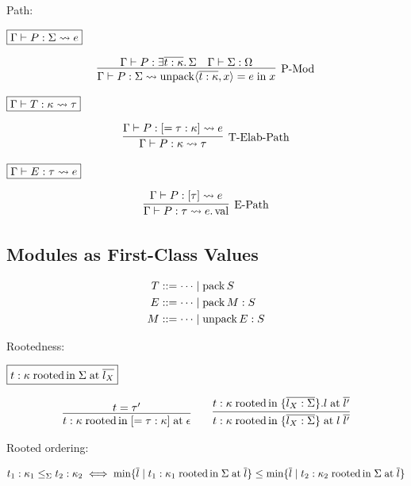 Path:

$\fbox{$\Gamma \vdash P: \Sigma \rightsquigarrow e$}$

\begin{gather*}
  \infer[\text{P-Mod}]{\Gamma \vdash P: \Sigma \elaborate \symunpack\langle \overline{t: \kappa}, x\rangle = e \symin x}{
    \Gamma \vdash P: \exists \overline{t: \kappa}\ldotp \Sigma
    &
    \Gamma \vdash \Sigma: \Omega
  }
\end{gather*}

$\fbox{$\Gamma \vdash T: \kappa \rightsquigarrow \tau$}$

\begin{gather*}
  \infer[\text{T-Elab-Path}]{\Gamma \vdash P: \kappa \elaborate \tau}{
    \Gamma \vdash P: [= \tau: \kappa] \elaborate e
  }
\end{gather*}

$\fbox{$\Gamma \vdash E: \tau \rightsquigarrow e$}$

\begin{gather*}
  \infer[\text{E-Path}]{\Gamma \vdash P: \tau \elaborate e.\symval}{
    \Gamma \vdash P: [\tau] \elaborate e
  }
\end{gather*}

\subsection{Modules as First-Class Values}

\begin{align*}
  T &\mathrel{::=} \cdots \mid \mathop{\mathrm{pack}} S \\
  E &\mathrel{::=} \cdots \mid \mathop{\mathrm{pack}} M: S \\
  M &\mathrel{::=} \cdots \mid \mathop{\mathrm{unpack}} E: S
\end{align*}

Rootedness:

$\fbox{$t: \kappa \mathrel{\mathrm{rooted}}\, \mathrel{\mathrm{in}} \Sigma \mathrel{\mathrm{at}} \overline{l_X}$}$

\begin{gather*}
  \infer{t: \kappa \symrooted\, \symin [= \tau: \kappa] \symat \epsilon}{
    t = \tau'
  }
  \hspace{2em}
  \infer{t: \kappa \symrooted\, \symin \{\overline{l_X: \Sigma}\} \symat l\; \overline{l'}}{
    t: \kappa \symrooted\, \symin \{\overline{l_X: \Sigma}\}.l \symat \overline{l'}
  }
\end{gather*}

Rooted ordering:

\begin{align*}
  t_1: \kappa_1 \leq_\Sigma t_2: \kappa_2 \iff
  \min\{\overline{l} \mid t_1: \kappa_1 \mathrel{\mathrm{rooted}}\, \mathrel{\mathrm{in}} \Sigma \mathrel{\mathrm{at}} \overline{l}\} \leq \min\{\overline{l} \mid t_2: \kappa_2 \mathrel{\mathrm{rooted}}\, \mathrel{\mathrm{in}} \Sigma \mathrel{\mathrm{at}} \overline{l}\}
\end{align*}

